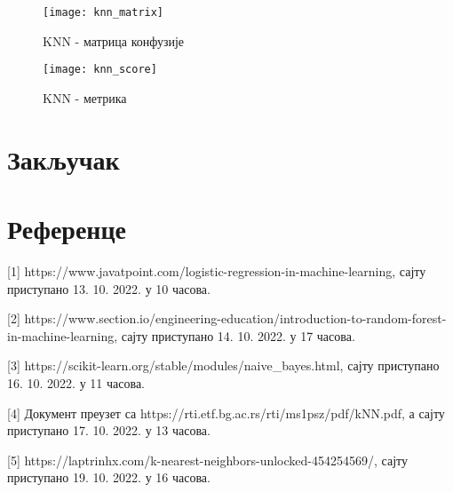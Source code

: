 \documentclass[11pt]{article} %
\begin{document}
\begin{figure}[h]
\centering
	\texttt{[image: knn\_matrix]} 
	\caption{KNN - матрица конфузије} 
\end{figure}

\begin{figure}[h]
\centering
	\texttt{[image: knn\_score]} 
	\caption{KNN - метрика} 
\end{figure}


\section{Закључак}
\newpage
\section{Референце}
[1] https://www.javatpoint.com/logistic-regression-in-machine-learning, сајту приступано 13. 10. 2022. у 10 часова.

[2] https://www.section.io/engineering-education/introduction-to-random-forest-in-machine-learning, сајту приступано 14. 10. 2022. у 17 часова.

[3] https://scikit-learn.org/stable/modules/naive\_bayes.html, сајту приступано 16. 10. 2022. у 11 часова.

[4] Документ преузет са https://rti.etf.bg.ac.rs/rti/ms1psz/pdf/kNN.pdf, а сајту приступано 17. 10. 2022. у 13 часова.

[5] https://laptrinhx.com/k-nearest-neighbors-unlocked-454254569/, сајту приступано 19. 10. 2022. у 16 часова.
\end{document}
